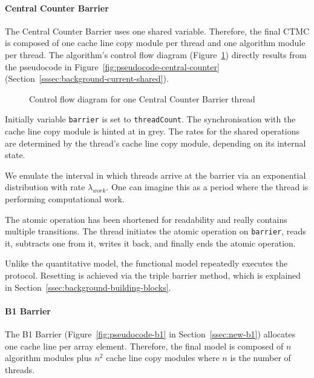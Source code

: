 \documentclass[a4paper, 10pt]{article}
\begin{document}
\paragraph{Central Counter Barrier}
\label{sssec:analysis-modelchecking-modelling-central-counter}
The Central Counter Barrier uses one shared variable. Therefore, the final CTMC is composed of one cache line copy module per thread and one algorithm module per thread.
The algorithm's control flow diagram (Figure~\ref{fig:model-central-counter}) directly results from the pseudocode in Figure~\ref{fig:pseudocode-central-counter} (Section~\ref{sssec:background-current-shared}).

\begin{figure}[htbp]
	\centering
	
	\caption{Control flow diagram for one Central Counter Barrier thread}
	\label{fig:model-central-counter}
\end{figure}

Initially variable \texttt{barrier} is set to \texttt{threadCount}.
The synchronisation with the cache line copy module is hinted at in grey.
The rates for the shared operations are determined by the thread's cache line copy module, depending on its internal state.

We emulate the interval in which threads arrive at the barrier via an exponential distribution with rate $\lambda_{\mathit{work}}$. One can imagine this as a period where the thread is performing computational work.

The atomic operation has been shortened for readability and really contains multiple transitions. The thread initiates the atomic operation on \texttt{barrier}, reads it, subtracts one from it, writes it back, and finally ends the atomic operation.

Unlike the quantitative model, the functional model repeatedly executes the protocol. Resetting is achieved via the triple barrier method, which is explained in Section~\ref{ssec:background-building-blocks}.

\paragraph{B1 Barrier}
\label{ssssec:analysis-modelchecking-modelling-b1}
The B1 Barrier (Figure~\ref{fig:pseudocode-b1} in Section~\ref{ssec:new-b1}) allocates one cache line per array element. Therefore, the final model is composed of $n$ algorithm modules plus $n^2$ cache line copy modules where $n$ is the number of threads.
\end{document}
